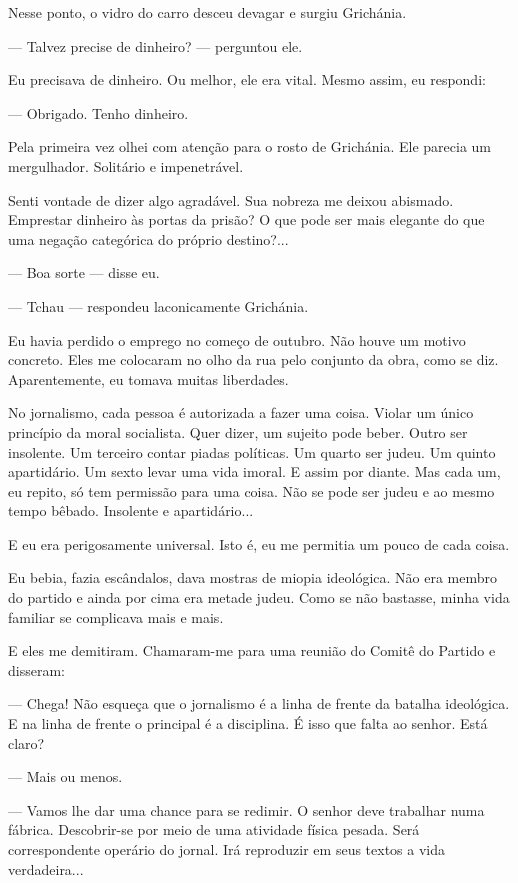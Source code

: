 Nesse ponto, o vidro do carro desceu devagar e surgiu Grichánia.

--- Talvez precise de dinheiro? --- perguntou ele.

Eu precisava de dinheiro. Ou melhor, ele era vital. Mesmo assim, eu
respondi:

--- Obrigado. Tenho dinheiro.

Pela primeira vez olhei com atenção para o rosto de Grichánia. Ele
parecia um mergulhador. Solitário e impenetrável.

Senti vontade de dizer algo agradável. Sua nobreza me deixou abismado.
Emprestar dinheiro às portas da prisão? O que pode ser mais elegante do
que uma negação categórica do próprio destino?...

--- Boa sorte --- disse eu.

--- Tchau --- respondeu laconicamente Grichánia.

Eu havia perdido o emprego no começo de outubro. Não houve um motivo
concreto. Eles me colocaram no olho da rua pelo conjunto da obra, como
se diz. Aparentemente, eu tomava muitas liberdades.

No jornalismo, cada pessoa é autorizada a fazer uma coisa. Violar um
único princípio da moral socialista. Quer dizer, um sujeito pode beber.
Outro ser insolente. Um terceiro contar piadas políticas. Um quarto ser
judeu. Um quinto apartidário. Um sexto levar uma vida imoral. E assim
por diante. Mas cada um, eu repito, só tem permissão para uma coisa. Não
se pode ser judeu e ao mesmo tempo bêbado. Insolente e apartidário...

E eu era perigosamente universal. Isto é, eu me permitia um pouco de
cada coisa.

Eu bebia, fazia escândalos, dava mostras de miopia ideológica. Não era
membro do partido e ainda por cima era metade judeu. Como se não
bastasse, minha vida familiar se complicava mais e mais.

E eles me demitiram. Chamaram-me para uma reunião do Comitê do Partido e
disseram:

--- Chega! Não esqueça que o jornalismo é a linha de frente da batalha
ideológica. E na linha de frente o principal é a disciplina. É isso que
falta ao senhor. Está claro?

--- Mais ou menos.

--- Vamos lhe dar uma chance para se redimir. O senhor deve trabalhar
numa fábrica. Descobrir-se por meio de uma atividade física pesada. Será
correspondente operário do jornal. Irá reproduzir em seus textos a vida
verdadeira...

